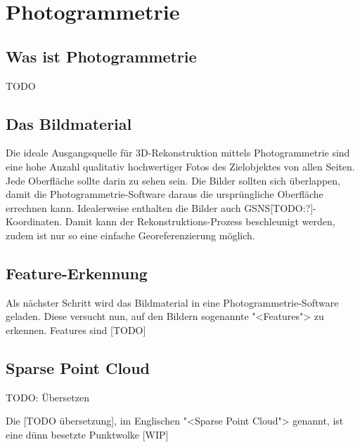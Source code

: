 \chapter{Photogrammetrie}

\section{Was ist Photogrammetrie}

TODO


\section{Das Bildmaterial}

Die ideale Ausgangsquelle für 3D-Rekonstruktion mittels Photogrammetrie sind
eine hohe Anzahl qualitativ hochwertiger Fotos des Zielobjektes von allen
Seiten. Jede Oberfläche sollte darin zu sehen sein. Die Bilder sollten sich
überlappen, damit die Photogrammetrie-Software daraus die ursprüngliche
Oberfläche errechnen kann. Idealerweise enthalten die Bilder auch
GSNS[TODO:?]-Koordinaten. Damit kann der Rekonstruktions-Prozess beschleunigt
werden, zudem ist nur so eine einfache Georeferenzierung möglich.


\section{Feature-Erkennung}

Als nächster Schritt wird das Bildmaterial in eine Photogrammetrie-Software
geladen. Diese versucht nun, auf den Bildern sogenannte "<Features"> zu
erkennen. Features sind [TODO]


\section{Sparse Point Cloud}

TODO: Übersetzen

Die [TODO übersetzung], im Englischen "<Sparse Point Cloud"> genannt, ist eine
dünn besetzte Punktwolke [WIP]
